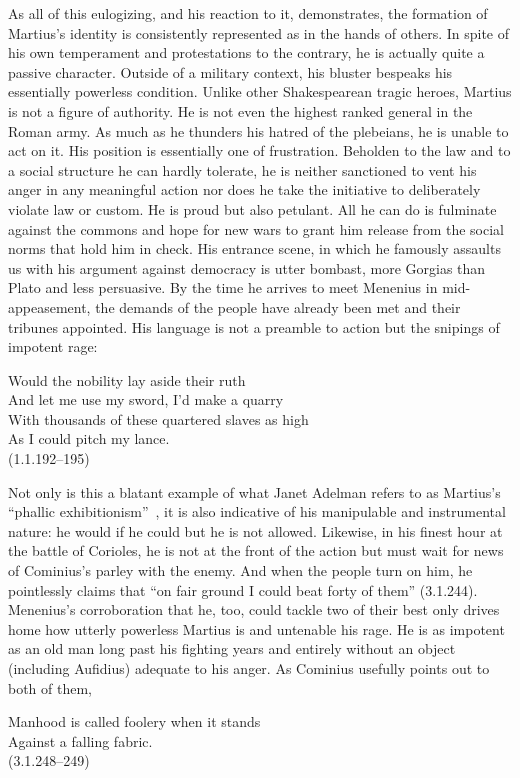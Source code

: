 As all of this eulogizing, and his reaction to it, demonstrates, the formation of Martius's identity is consistently represented as in the hands of others.
In spite of his own temperament and protestations to the contrary, he is actually quite a passive character.
Outside of a military context, his bluster bespeaks his essentially powerless condition.
Unlike other Shakespearean tragic heroes, Martius is not a figure of authority.
He is not even the highest ranked general in the Roman army.
As much as he thunders his hatred of the plebeians, he is unable to act on it.
His position is essentially one of frustration.
Beholden to the law and to a social structure he can hardly tolerate, he is neither sanctioned to vent his anger in any meaningful action nor does he take the initiative to deliberately violate law or custom.
He is proud but also petulant.
All he can do is fulminate against the commons and hope for new wars to grant him release from the social norms that hold him in check.
His entrance scene, in which he famously assaults us with his argument against democracy is utter bombast, more Gorgias than Plato and less persuasive.
By the time he arrives to meet Menenius in mid-appeasement, the demands of the people have already been met and their tribunes appointed.
His language is not a preamble to action but the snipings of impotent rage:
\begin{vq}
Would the nobility lay aside their ruth\\
And let me use my sword, I'd make a quarry\\
With thousands of these quartered slaves as high\\
As I could pitch my lance.\\
\hfill(1.1.192--195)
\end{vq}
Not only is this a blatant example of what Janet Adelman refers to as Martius's ``phallic exhibitionism''~\cite[132]{adelman_angers_1980}, it is also indicative of his manipulable and instrumental nature: he would if he could but he is not allowed.
Likewise, in his finest hour at the battle of Corioles, he is not at the front of the action but must wait for news of Cominius's parley with the enemy.
And when the people turn on him, he pointlessly claims that ``on fair ground I could beat forty of them'' (3.1.244).
Menenius's corroboration that he, too, could tackle two of their best only drives home how utterly powerless Martius is and untenable his rage.
He is as impotent as an old man long past his fighting years and entirely without an object (including Aufidius) adequate to his anger.
As Cominius usefully points out to both of them,
\begin{vq}
Manhood is called foolery when it stands\\
Against a falling fabric.\\
\hfill(3.1.248--249)
\end{vq}


